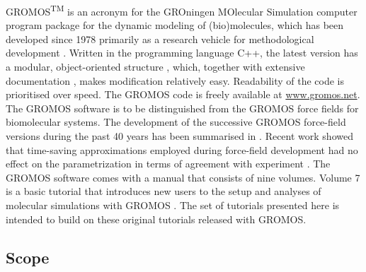 %
%
GROMOS\textsuperscript{TM} is an acronym for the GROningen MOlecular Simulation computer program package for the dynamic modeling of (bio)molecules, which has been developed since 1978 primarily as a research vehicle for methodological development \cite{wfvgn_35_years}. Written in the programming language C++, the latest version has a modular, object-oriented structure \cite{Schmid_2012}, which, together with extensive documentation \cite{volumes_1_to_9}, makes modification relatively easy. Readability of the code is prioritised over speed. The GROMOS code is freely available at \url{www.gromos.net}. The GROMOS software is to be distinguished from the GROMOS force fields for biomolecular systems. The development of the successive GROMOS force-field versions during the past 40 years has been summarised in \cite{wfvgn_35_years,Riniker_FCFF}. 
Recent work showed that time-saving approximations employed during force-field development had no effect on the parametrization in terms of agreement with experiment \cite{Diem_2020, Diem_2_2020}.
The GROMOS software comes with a manual that consists of nine volumes. Volume 7 is a basic tutorial that introduces new users to the setup and analyses of molecular simulations with GROMOS \cite{volume_7}.
The set of tutorials presented here is intended to build on these original tutorials released with GROMOS.

%
\subsection{Scope}



